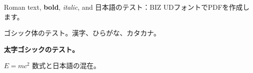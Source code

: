 \documentclass{article}
\begin{document}
Roman text, \textbf{bold}, \textit{italic}, and 日本語のテスト：BIZ UDフォントでPDFを作成します。

{\sffamily ゴシック体のテスト。漢字、ひらがな、カタカナ。}

{\sffamily\bfseries 太字ゴシックのテスト。}

$E=mc^2$ 数式と日本語の混在。
\end{document}

